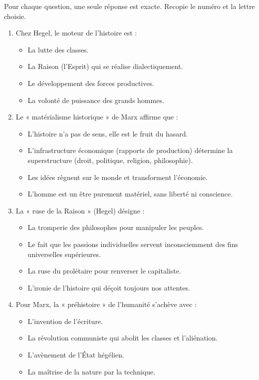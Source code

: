\documentclass[11pt]{article}
\begin{document}
\begin{exercice}
Pour chaque question, une seule réponse est exacte. Recopie le numéro et la lettre choisie.
\begin{enumerate}
\item Chez Hegel, le moteur de l'histoire est :
\begin{itemize}
\item[A.] La lutte des classes.
\item[B.] La Raison (l'Esprit) qui se réalise dialectiquement.
\item[C.] Le développement des forces productives.
\item[D.] La volonté de puissance des grands hommes.
\end{itemize}
\item Le « matérialisme historique » de Marx affirme que :
\begin{itemize}
\item[A.] L'histoire n'a pas de sens, elle est le fruit du hasard.
\item[B.] L'infrastructure économique (rapports de production) détermine la superstructure (droit, politique, religion, philosophie).
\item[C.] Les idées règnent sur le monde et transforment l'économie.
\item[D.] L'homme est un être purement matériel, sans liberté ni conscience.
\end{itemize}
\item La « ruse de la Raison » (Hegel) désigne :
\begin{itemize}
\item[A.] La tromperie des philosophes pour manipuler les peuples.
\item[B.] Le fait que les passions individuelles servent inconsciemment des fins universelles supérieures.
\item[C.] La ruse du prolétaire pour renverser le capitaliste.
\item[D.] L'ironie de l'histoire qui déçoit toujours nos attentes.
\end{itemize}
\item Pour Marx, la « préhistoire » de l'humanité s'achève avec :
\begin{itemize}
\item[A.] L'invention de l'écriture.
\item[B.] La révolution communiste qui abolit les classes et l'aliénation.
\item[C.] L'avènement de l'État hégélien.
\item[D.] La maîtrise de la nature par la technique.
\end{itemize}
\end{enumerate}
\end{exercice}
\end{document}
